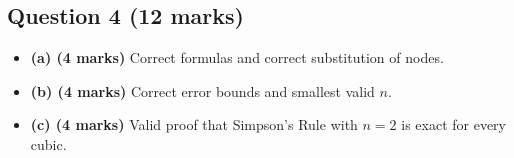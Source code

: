 \documentclass[12pt]{article}
\begin{document}
\subsection{Question 4 \hfill (12 marks)}
\begin{itemize}[leftmargin=1.6em]
\item \textbf{(a) (4 marks)} Correct formulas and correct substitution of nodes.
\item \textbf{(b) (4 marks)} Correct error bounds and smallest valid \(n\).
\item \textbf{(c) (4 marks)} Valid proof that Simpson's Rule with \(n=2\) is exact for every cubic.
\end{itemize}
\end{document}
